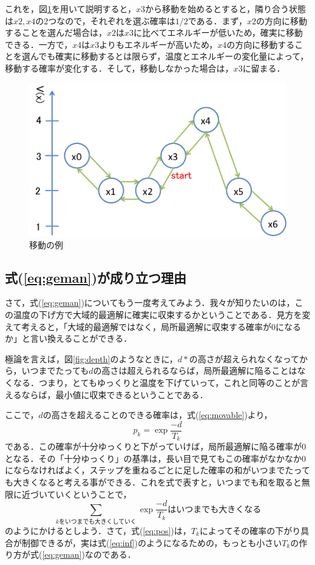 \documentclass{jarticle}
\begin{document}
これを，図\ref{fig:move}を用いて説明すると，$x3$から移動を始めるとすると，隣り合う状態は$x2,x4$の$2$つなので，それぞれを選ぶ確率は$1/2$である．まず，$x2$の方向に移動することを選んだ場合は，$x2$は$x3$に比べてエネルギーが低いため，確実に移動できる．一方で，$x4$は$x3$よりもエネルギーが高いため，$x4$の方向に移動することを選んでも確実に移動するとは限らず，温度とエネルギーの変化量によって，移動する確率が変化する．そして，移動しなかった場合は，$x3$に留まる．
\begin{figure}[H]
\begin{center}
	\includegraphics[width=120mm]{image/move.png}
	\caption{移動の例}
	\label{fig:move}
\end{center}
\end{figure}


\subsection{式(\ref{eq:geman})が成り立つ理由}
さて，式(\ref{eq:geman})についてもう一度考えてみよう．我々が知りたいのは，この温度の下げ方で大域的最適解に確実に収束するかということである．見方を変えて考えると，「大域的最適解ではなく，局所最適解に収束する確率が$0$になるか」と言い換えることができる．

極論を言えば，図\ref{fig:depth}のようなときに，$d*$の高さが超えられなくなってから，いつまでたっても$d$の高さは超えられるならば，局所最適解に陥ることはなくなる．つまり，とてもゆっくりと温度を下げていって，これと同等のことが言えるならば，最小値に収束できるということである．

ここで，$d$の高さを超えることのできる確率は，式(\ref{eq:movable})より，
\begin{equation}
\label{eq:pos}
	p_k = \exp \frac{-d}{T_k}
\end{equation}
である．この確率が十分ゆっくりと下がっていけば，局所最適解に陥る確率が$0$となる．その「十分ゆっくり」の基準は，長い目で見てもこの確率がなかなか$0$にならなければよく，ステップを重ねるごとに足した確率の和がいつまでたっても大きくなると考える事ができる．これを式で表すと，いつまでも和を取ると無限に近づいていくということで，
\begin{equation}
\label{eq:inf}
	\sum_{ kをいつまでも大きくしていく} \exp \frac{-d}{T_k} はいつまでも大きくなる
\end{equation}
のようにかけるとしよう．さて，式(\ref{eq:pos})は，$T_k$によってその確率の下がり具合が制御できるが，実は式(\ref{eq:inf})のようになるための，もっとも小さい$T_k$の作り方が式(\ref{eq:geman})なのである．
\end{document}
